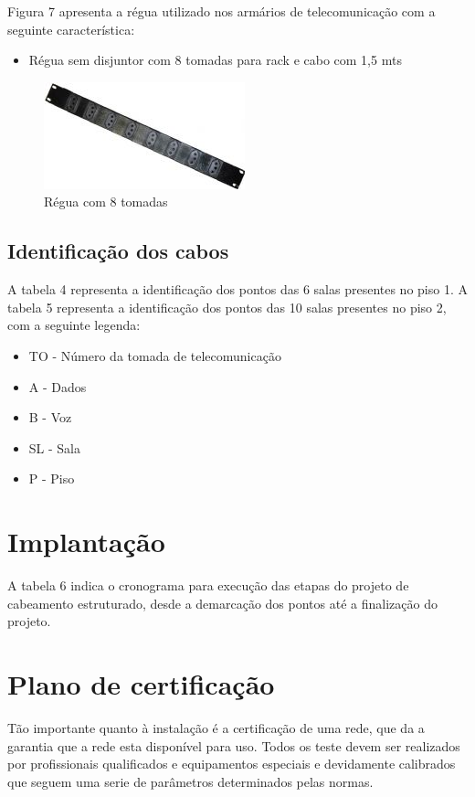 \documentclass[	DIV=calc,%
							paper=a4,%
							fontsize=12pt,%
							onecolumn]{scrartcl}	 					%
\begin{document}
Figura 7 apresenta a régua utilizado nos armários de telecomunicação com a seguinte característica: 
\begin{itemize}
\item Régua sem disjuntor com 8 tomadas para rack e cabo com 1,5 mts
\end{itemize}

\begin{figure}
	\centering
	\includegraphics[]{regua}
	\caption{Régua com 8 tomadas}
	\label{fig7}
\end{figure}


\subsection{Identificação dos cabos}
A tabela 4 representa a identificação dos pontos das 6 salas presentes no piso 1.
A tabela 5 representa a identificação dos pontos das 10 salas presentes no piso 2, com a seguinte legenda:
\begin{itemize}
\item TO - Número da tomada de telecomunicação
\item A  - Dados 
\item B  - Voz	
\item SL - Sala 
\item P  - Piso
\end{itemize}





\section{Implantação}
A tabela 6 indica o cronograma para execução das etapas do projeto de cabeamento estruturado, desde a demarcação dos pontos até a finalização do projeto.



\section{Plano de certificação}
Tão importante quanto à instalação é a certificação de uma rede, que da a garantia que a rede esta disponível para uso. Todos os teste devem ser realizados por profissionais qualificados e equipamentos especiais e devidamente calibrados que seguem uma serie de parâmetros determinados pelas normas.
\end{document}
